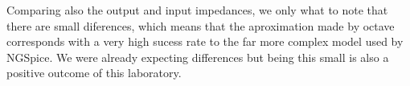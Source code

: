 
%    

Comparing also the output and input impedances, we only what to note that there are small diferences, which means that the aproximation made by octave corresponds with a very high sucess rate to the far more complex model used by NGSpice. We were already expecting differences but being this small is also a positive outcome of this laboratory.








